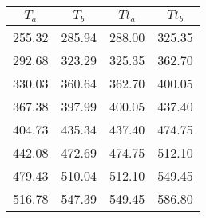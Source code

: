 \begin{large}\begin{tabular}{|c|c|c|c|}
\hline
$T_a$&$T_b$&$Tt_a$&$Tt_b$\\\hline
255.32&285.94&288.00&325.35\\\hline
292.68&323.29&325.35&362.70\\\hline
330.03&360.64&362.70&400.05\\\hline
367.38&397.99&400.05&437.40\\\hline
404.73&435.34&437.40&474.75\\\hline
442.08&472.69&474.75&512.10\\\hline
479.43&510.04&512.10&549.45\\\hline
516.78&547.39&549.45&586.80\\\hline
\end{tabular}
\end{large}